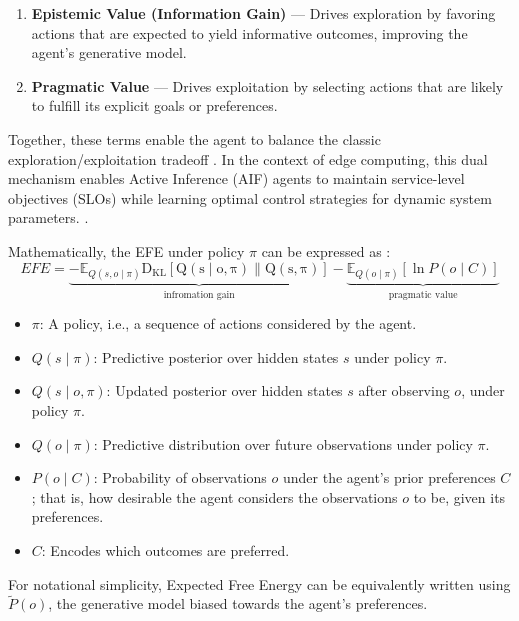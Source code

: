 \begin{enumerate}
  \item \textbf{Epistemic Value (Information Gain)} — Drives exploration by favoring actions that are expected to yield informative outcomes, improving the agent’s generative model.
  \item \textbf{Pragmatic Value} — Drives exploitation by selecting actions that are likely to fulfill its explicit goals or preferences.
\end{enumerate}

Together, these terms enable the agent to balance the classic exploration/exploitation tradeoff \cite{sedlak_adaptive_2024, danilenka_adaptive_2025}. In the context of edge computing, this dual mechanism enables Active Inference (AIF) agents to maintain service-level objectives (SLOs) while learning optimal control strategies for dynamic system parameters. \cite{lapkovskis_benchmarking_2025}.

Mathematically, the EFE under policy \(\pi\) can be expressed as \cite{parr_active_2022}:
\begin{equation}
EFE=\underbrace{-\mathbb{E}_{Q(s, o \mid \pi)} \mathrm{D_{KL} \left[ Q(s \mid o, \pi) \parallel Q(s, \pi) \right] }}_{\text{infromation gain}} - \underbrace{\mathbb{E}_{Q(o \mid \pi)} \left[ \ln P(o \mid C) \right]}_{\text{pragmatic value}}
\label{eq:expected-free-energy-formal}
\end{equation}

\begin{itemize}
  \item \( \pi \): A policy, i.e., a sequence of actions considered by the agent.
  \item \( Q(s \mid \pi) \): Predictive posterior over hidden states \(s\) under policy \(\pi\).
  \item \( Q(s \mid o, \pi) \): Updated posterior over hidden states \(s\) after observing \(o\), under policy \(\pi\).
  \item \( Q(o \mid \pi) \): Predictive distribution over future observations under policy \(\pi\).
  \item \( P(o \mid C) \): Probability of observations \(o\) under the agent’s prior preferences \(C\); that is, how desirable the agent considers the observations \(o\) to be, given its preferences.
  \item \( C \): Encodes which outcomes are preferred.
\end{itemize}

For notational simplicity, Expected Free Energy can be equivalently written using \( \tilde{P}(o) \), the generative model biased towards the agent's preferences.

